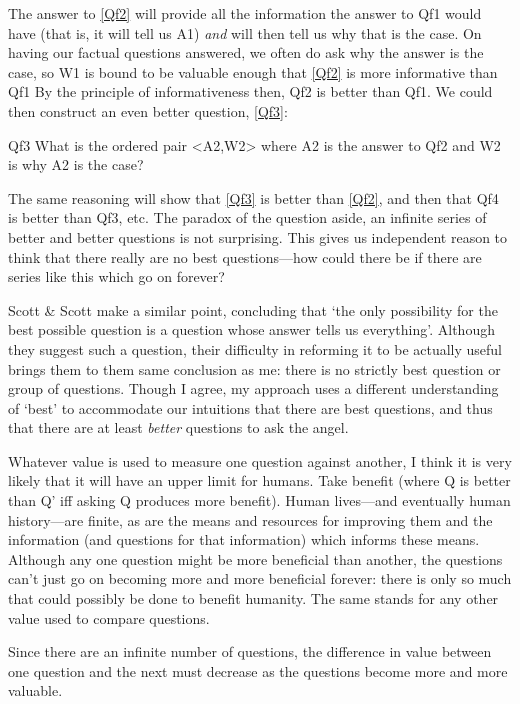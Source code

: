 The answer to \ref{Qf2} will provide all the information the answer to Qf1 would have (that is, it will tell us A1) \emph{and} will  then tell us why that is the case.
On having our factual questions answered, we often do ask why the answer is the case, so W1 is bound to be valuable enough that \ref{Qf2} is more informative than Qf1
By the principle of informativeness then, Qf2 is better than Qf1.
We could then construct an even better question, \ref{Qf3}:

	\begin{principle}{Qf3}\label{Qf3}
	What is the ordered pair <A2,W2> where A2 is the answer to Qf2 and W2 is why A2 is the case?
	\end{principle}

The same reasoning will show that \ref{Qf3} is better than \ref{Qf2}, and then that Qf4 is better than Qf3, etc.
The paradox of the question aside, an infinite series of better and better questions is not surprising.
This gives us independent reason to think that there really are no best questions---how could there be if there are series like this which go on forever?

Scott \& Scott make a similar point, concluding that `the only possibility for the best possible question is a question whose answer tells us everything'.
\parencite[332]{Scott_1999}
Although they suggest such a question, their difficulty in reforming it to be actually useful brings them to them same conclusion as me: there is no strictly best question or group of questions.
Though I agree, my approach uses a different understanding of `best' to accommodate our intuitions that there are best questions, and thus that there are at least \emph{better} questions to ask the angel.

Whatever value is used to measure one question against another, I think it is very likely that it will have an upper limit for humans.
Take benefit (where Q is better than Q' iff asking Q produces more benefit).
Human lives---and eventually human history---are finite, as are the means and resources for improving them and the information (and questions for that information) which informs these means.
Although any one question might be more beneficial than another, the questions can't just go on becoming more and more beneficial forever: there is only so much that could possibly be done to benefit humanity.
The same stands for any other value used to compare questions.

Since there are an infinite number of questions, the difference in value between one question and the next must decrease as the questions become more and more valuable.

